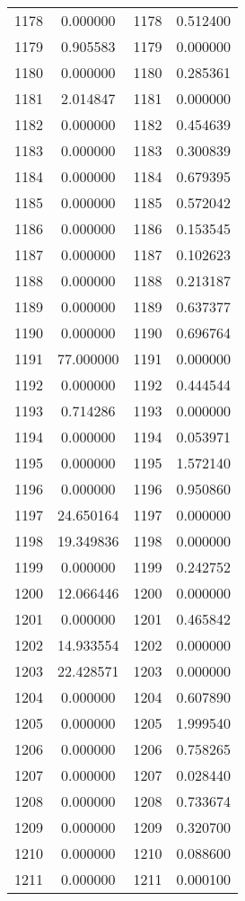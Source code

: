 \documentclass[12pt]{article}
\begin{document}
\begin{longtable}{@{}cccc@{}}
1178 & 0.000000 & 1178 & 0.512400 \\
1179 & 0.905583 & 1179 & 0.000000 \\
1180 & 0.000000 & 1180 & 0.285361 \\
1181 & 2.014847 & 1181 & 0.000000 \\
1182 & 0.000000 & 1182 & 0.454639 \\
1183 & 0.000000 & 1183 & 0.300839 \\
1184 & 0.000000 & 1184 & 0.679395 \\
1185 & 0.000000 & 1185 & 0.572042 \\
1186 & 0.000000 & 1186 & 0.153545 \\
1187 & 0.000000 & 1187 & 0.102623 \\
1188 & 0.000000 & 1188 & 0.213187 \\
1189 & 0.000000 & 1189 & 0.637377 \\
1190 & 0.000000 & 1190 & 0.696764 \\
1191 & 77.000000 & 1191 & 0.000000 \\
1192 & 0.000000 & 1192 & 0.444544 \\
1193 & 0.714286 & 1193 & 0.000000 \\
1194 & 0.000000 & 1194 & 0.053971 \\
1195 & 0.000000 & 1195 & 1.572140 \\
1196 & 0.000000 & 1196 & 0.950860 \\
1197 & 24.650164 & 1197 & 0.000000 \\
1198 & 19.349836 & 1198 & 0.000000 \\
1199 & 0.000000 & 1199 & 0.242752 \\
1200 & 12.066446 & 1200 & 0.000000 \\
1201 & 0.000000 & 1201 & 0.465842 \\
1202 & 14.933554 & 1202 & 0.000000 \\
1203 & 22.428571 & 1203 & 0.000000 \\
1204 & 0.000000 & 1204 & 0.607890 \\
1205 & 0.000000 & 1205 & 1.999540 \\
1206 & 0.000000 & 1206 & 0.758265 \\
1207 & 0.000000 & 1207 & 0.028440 \\
1208 & 0.000000 & 1208 & 0.733674 \\
1209 & 0.000000 & 1209 & 0.320700 \\
1210 & 0.000000 & 1210 & 0.088600 \\
1211 & 0.000000 & 1211 & 0.000100 \\

\end{longtable}
\end{document}

